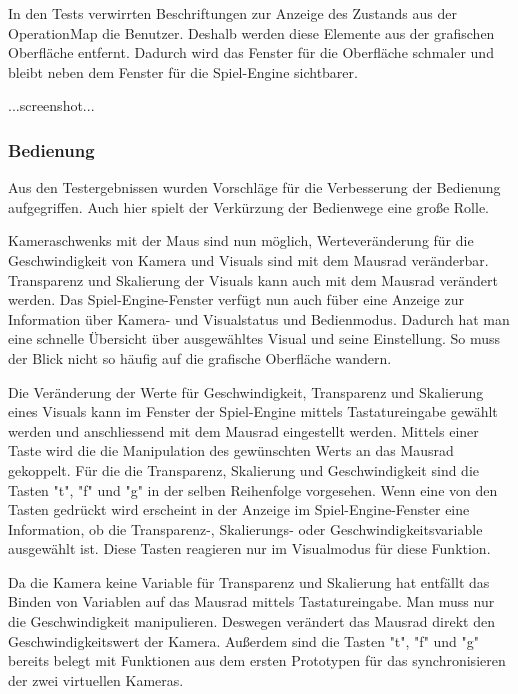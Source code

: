 In den Tests verwirrten Beschriftungen zur Anzeige des Zustands aus der OperationMap die Benutzer. Deshalb werden diese Elemente aus der
grafischen Oberfl\"ache entfernt. Dadurch wird das Fenster f\"ur die Oberfl\"ache schmaler und bleibt neben dem Fenster f\"ur die
Spiel-Engine sichtbarer.

...screenshot...

\subsubsection{Bedienung}

Aus den Testergebnissen wurden Vorschl\"age f\"ur die Verbesserung der Bedienung aufgegriffen. Auch hier spielt der Verk\"urzung der
Bedienwege eine gro\ss{}e Rolle.

Kameraschwenks mit der Maus sind nun m\"oglich,
Wertever\"anderung f\"ur die Geschwindigkeit von Kamera und Visuals sind mit dem Mausrad ver\"anderbar. Transparenz und Skalierung der Visuals
kann auch mit dem Mausrad ver\"andert werden. Das Spiel-Engine-Fenster verf\"ugt nun auch f\"uber eine Anzeige zur Information \"uber
Kamera- und Visualstatus und Bedienmodus. Dadurch hat man eine schnelle \"Ubersicht \"uber ausgew\"ahltes Visual und seine Einstellung.
So muss der Blick nicht so h\"aufig auf die grafische Oberfl\"ache wandern.

Die Ver\"anderung der Werte f\"ur Geschwindigkeit, Transparenz und Skalierung eines Visuals kann im Fenster der Spiel-Engine mittels
Tastatureingabe gew\"ahlt werden und anschliessend mit dem Mausrad eingestellt werden. Mittels einer Taste wird die die Manipulation des
gew\"unschten Werts an das Mausrad gekoppelt. F\"ur die die Transparenz, Skalierung und Geschwindigkeit sind die Tasten "t", "f" und "g" in der
selben Reihenfolge vorgesehen. Wenn eine von den Tasten gedr\"uckt wird erscheint in der Anzeige im Spiel-Engine-Fenster eine Information, ob
die Transparenz-, Skalierungs- oder Geschwindigkeitsvariable ausgew\"ahlt ist. Diese Tasten reagieren nur im Visualmodus f\"ur diese Funktion.

Da die Kamera keine Variable f\"ur Transparenz und Skalierung hat entf\"allt das Binden von Variablen auf das Mausrad mittels Tastatureingabe.
Man muss nur die Geschwindigkeit manipulieren. Deswegen ver\"andert das Mausrad direkt den Geschwindigkeitswert der Kamera. Au\ss{}erdem sind
die Tasten "t", "f" und "g" bereits belegt mit Funktionen aus dem ersten Prototypen f\"ur das synchronisieren der zwei virtuellen Kameras.

